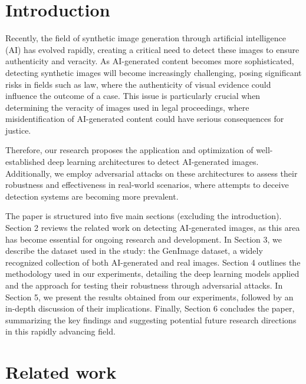 \documentclass[runningheads]{llncs}
\begin{document}
\section{Introduction}

Recently, the field of synthetic image generation through artificial intelligence (AI) has evolved rapidly, creating a critical need to detect these images to ensure authenticity and veracity. As AI-generated content becomes more sophisticated, detecting synthetic images will become increasingly challenging, posing significant risks in fields such as law, where the authenticity of visual evidence could influence the outcome of a case. This issue is particularly crucial when determining the veracity of images used in legal proceedings, where misidentification of AI-generated content could have serious consequences for justice.

Therefore, our research proposes the application and optimization of well-established deep learning architectures to detect AI-generated images. Additionally, we employ adversarial attacks on these architectures to assess their robustness and effectiveness in real-world scenarios, where attempts to deceive detection systems are becoming more prevalent.

The paper is structured into five main sections (excluding the introduction). Section 2 reviews the related work on detecting AI-generated images, as this area has become essential for ongoing research and development. In Section 3, we describe the dataset used in the study: the GenImage dataset, a widely recognized collection of both AI-generated and real images. Section 4 outlines the methodology used in our experiments, detailing the deep learning models applied and the approach for testing their robustness through adversarial attacks. In Section 5, we present the results obtained from our experiments, followed by an in-depth discussion of their implications. Finally, Section 6 concludes the paper, summarizing the key findings and suggesting potential future research directions in this rapidly advancing field.

%
%
\section{Related work}
\end{document}
